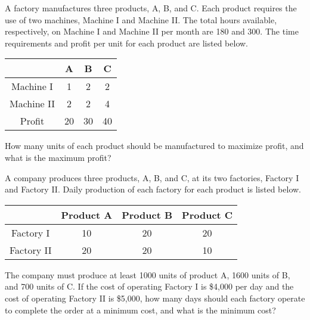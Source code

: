 \begin{puzzle}
    A factory manufactures three products, A, B, and C. Each product requires the use of two machines, Machine I and Machine II. The total hours available, respectively, on Machine I and Machine II per month are 180 and 300. The time requirements and profit per unit for each product are listed below.

    \begin{center}
        \begin{tabular}{|c|c|c|c|}
            \hline
                       & A  & B  & C  \\
            \hline
            Machine I  & 1  & 2  & 2  \\
            \hline
            Machine II & 2  & 2  & 4  \\
            \hline
            Profit     & 20 & 30 & 40 \\
            \hline
        \end{tabular}
    \end{center}



    How many units of each product should be manufactured to maximize profit, and what is the maximum profit?
\end{puzzle}

\begin{puzzle}
    A company produces three products, A, B, and C, at its two factories, Factory I and Factory II. Daily production of each factory for each product is listed below.

    \begin{center}
        \begin{tabular}{|c|c|c|c|}
            \hline
                       & Product A & Product B & Product C \\
            \hline
            Factory I  & 10        & 20        & 20        \\
            \hline
            Factory II & 20        & 20        & 10        \\
            \hline
        \end{tabular}
    \end{center}

    The company must produce at least 1000 units of product A, 1600 units of B, and 700 units of C. If the cost of operating Factory I is \$4,000 per day and the cost of operating Factory II is \$5,000, how many days should each factory operate to complete the order at a minimum cost, and what is the minimum cost?
\end{puzzle}








